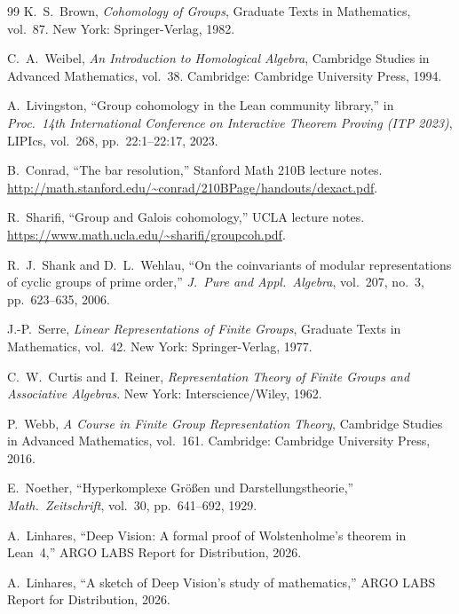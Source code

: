 \documentclass[11pt]{article}
\theoremstyle{definition}
\theoremstyle{remark}
\begin{document}
\begin{thebibliography}{99}
K.~S.~Brown,
\emph{Cohomology of Groups},
Graduate Texts in Mathematics, vol.~87.
New York: Springer-Verlag, 1982.

C.~A.~Weibel,
\emph{An Introduction to Homological Algebra},
Cambridge Studies in Advanced Mathematics, vol.~38.
Cambridge: Cambridge University Press, 1994.

A.~Livingston,
``Group cohomology in the Lean community library,''
in \emph{Proc.\ 14th International Conference on Interactive Theorem
Proving (ITP 2023)}, LIPIcs, vol.~268, pp.~22:1--22:17, 2023.

B.~Conrad,
``The bar resolution,''
Stanford Math 210B lecture notes.
\url{http://math.stanford.edu/~conrad/210BPage/handouts/dexact.pdf}.

R.~Sharifi,
``Group and Galois cohomology,''
UCLA lecture notes.
\url{https://www.math.ucla.edu/~sharifi/groupcoh.pdf}.

R.~J.~Shank and D.~L.~Wehlau,
``On the coinvariants of modular representations of cyclic groups
of prime order,''
\emph{J.\ Pure and Appl.\ Algebra}, vol.~207, no.~3,
pp.~623--635, 2006.

J.-P.~Serre,
\emph{Linear Representations of Finite Groups},
Graduate Texts in Mathematics, vol.~42.
New York: Springer-Verlag, 1977.

C.~W.~Curtis and I.~Reiner,
\emph{Representation Theory of Finite Groups and Associative
Algebras}.
New York: Interscience/Wiley, 1962.

P.~Webb,
\emph{A Course in Finite Group Representation Theory},
Cambridge Studies in Advanced Mathematics, vol.~161.
Cambridge: Cambridge University Press, 2016.

E.~Noether,
``Hyperkomplexe Gr\"o\ss en und Darstellungstheorie,''
\emph{Math.\ Zeitschrift}, vol.~30, pp.~641--692, 1929.

A.~Linhares,
``Deep Vision: A formal proof of Wolstenholme's theorem in Lean~4,''
ARGO LABS Report for Distribution, 2026.

A.~Linhares,
``A sketch of Deep Vision's study of mathematics,''
ARGO LABS Report for Distribution, 2026.
\end{thebibliography}
\end{document}
